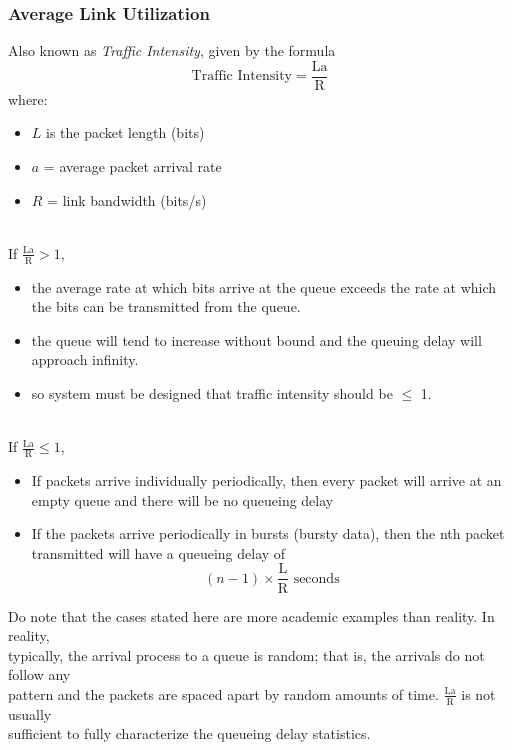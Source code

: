 \documentclass[a4paper]{article}
\begin{document}
\subsubsection{Average Link Utilization}
Also known as \textit{Traffic Intensity}, given by the formula
$$ \text{Traffic Intensity} = \frac{\text{La}}{\text{R}} $$
where:
\begin{itemize}
	\item $L$ is the packet length (bits)
	\item $a$ = average packet arrival rate
	\item $R$ = link bandwidth (bits/s)
\end{itemize}
\mbox{}\\
If $\frac{\text{La}}{\text{R}} > 1$,
\begin{itemize}
	\item the average rate at which bits arrive at the queue exceeds the rate at which the bits can be transmitted from the queue.
	\item the queue will tend to increase without bound and the queuing delay will approach infinity.
	\item so system must be designed that traffic intensity should be $\leq$ 1.
\end{itemize}
\mbox{}\\
If $\frac{\text{La}}{\text{R}} \leq 1$,
\begin{itemize}
	\item If packets arrive individually periodically, then every packet will arrive at an empty queue and there will be no queueing delay
	\item If the packets arrive periodically in bursts (bursty data), then the nth packet transmitted will have a queueing delay of $$(n-1)\times\frac{\text{L}}{\text{R}} \text { seconds}$$
\end{itemize}
\begin{framed}
	\begin{displayquote}
		Do note that the cases stated here are more academic examples than reality. In reality,\\ typically, the arrival process to a queue is random; that is, the arrivals do not follow any\\pattern and the packets are spaced apart by random amounts of time. $\frac{\text{La}}{\text{R}}$ is not usually\\ sufficient to fully characterize the queueing delay statistics.
	\end{displayquote}
\end{framed}
\end{document}
